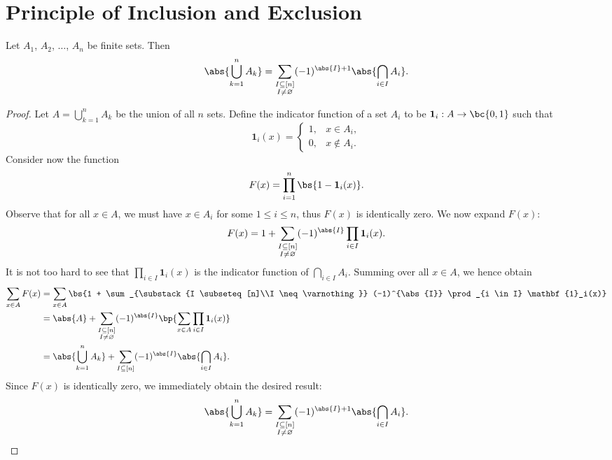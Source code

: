 \chapter{Principle of Inclusion and Exclusion}

\begin{theorem}
    Let $A_1$, $A_2$, $\dots$, $A_n$ be finite sets. Then \[\abs{\bigcup_{k = 1}^n A_k} = \sum_{\substack{I \subseteq [n]\\I \neq \varnothing}} (-1)^{\abs{I} + 1} \abs{\bigcap_{i \in I} A_i}.\]
\end{theorem}
\begin{proof}
    Let $A = \bigcup_{k = 1}^n A_k$ be the union of all $n$ sets. Define the indicator function of a set $A_i$ to be $\mathbf{1}_{i} : A \to \bc{0, 1}$ such that \[\mathbf{1}_{i}(x) = \begin{cases} 1, & x \in A_i, \\ 0, & x \notin A_i.\end{cases}\] Consider now the function \[F(x) = \prod_{i = 1}^n \bs{1 - \mathbf{1}_i(x)}.\] Observe that for all $x \in A$, we must have $x \in A_i$ for some $1 \leq i \leq n$, thus $F(x)$ is identically zero. We now expand $F(x)$: \[F(x) = 1 + \sum_{\substack{I \subseteq [n]\\I \neq \varnothing}} (-1)^{\abs{I}} \prod_{i \in I} \mathbf{1}_i(x).\] It is not too hard to see that $\prod_{i \in I} \mathbf{1}_i(x)$ is the indicator function of $\bigcap_{i \in I} A_i$. Summing over all $x \in A$, we hence obtain
    \begin{align*}
        \sum_{x \in A} F(x) &= \sum_{x \in A} \bs{1 + \sum_{\substack{I \subseteq [n]\\I \neq \varnothing}} (-1)^{\abs{I}} \prod_{i \in I} \mathbf{1}_i(x)}\\
        &= \abs{A} + \sum_{\substack{I \subseteq [n]\\I \neq \varnothing}} (-1)^{\abs{I}} \bp{\sum_{x \in A} \prod_{i \in I} \mathbf{1}_i(x)}\\
        &= \abs{\bigcup_{k = 1}^n A_k} + \sum_{I \subseteq [n]} (-1)^{\abs{I}} \abs{\bigcap_{i \in I} A_i}.
    \end{align*}
    Since $F(x)$ is identically zero, we immediately obtain the desired result: \[\abs{\bigcup_{k = 1}^n A_k} = \sum_{\substack{I \subseteq [n]\\I \neq \varnothing}} (-1)^{\abs{I} + 1} \abs{\bigcap_{i \in I} A_i}.\]
\end{proof}

